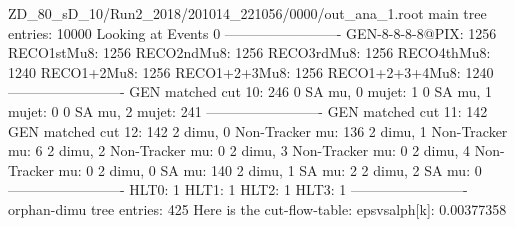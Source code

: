 ZD_80_sD_10/Run2_2018/201014_221056/0000/out_ana_1.root
main tree entries: 10000
Looking at Events 0
-------------------------
GEN-8-8-8-8@PIX: 1256
RECO1stMu8: 1256
RECO2ndMu8: 1256
RECO3rdMu8: 1256
RECO4thMu8: 1240
RECO1+2Mu8: 1256
RECO1+2+3Mu8: 1256
RECO1+2+3+4Mu8: 1240
-------------------------
GEN matched cut 10: 246
0 SA mu, 0 mujet: 1
0 SA mu, 1 mujet: 0
0 SA mu, 2 mujet: 241
-------------------------
GEN matched cut 11: 142
GEN matched cut 12: 142
2 dimu, 0 Non-Tracker mu: 136
2 dimu, 1 Non-Tracker mu: 6
2 dimu, 2 Non-Tracker mu: 0
2 dimu, 3 Non-Tracker mu: 0
2 dimu, 4 Non-Tracker mu: 0
2 dimu, 0 SA mu: 140
2 dimu, 1 SA mu: 2
2 dimu, 2 SA mu: 0
-------------------------
HLT0: 1
HLT1: 1
HLT2: 1
HLT3: 1
-------------------------
orphan-dimu tree entries: 425
Here is the cut-flow-table:
epsvsalph[k]: 0.00377358
        
